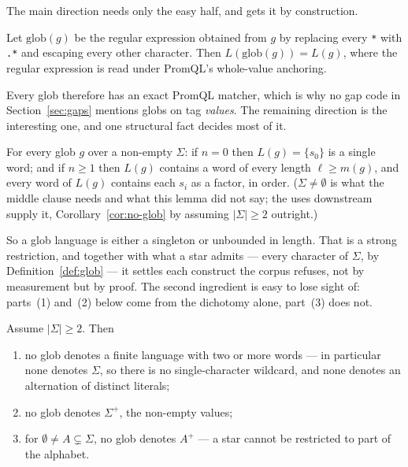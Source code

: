 The main direction needs only the easy half, and gets it by construction.

\begin{proposition}\label{prop:glob-regex}
Let $\mathrm{glob}(g)$ be the regular expression obtained from $g$ by replacing every
\texttt{*} with \texttt{.*} and escaping every other character. Then
$L(\mathrm{glob}(g))=L(g)$, where the regular expression is read under PromQL's whole-value
anchoring.
\end{proposition}

\iffull\fi

\noindent
Every glob therefore has an exact PromQL matcher, which is why no gap code in
Section~\ref{sec:gaps} mentions globs on tag \emph{values}. The remaining direction is
the interesting one, and one structural fact decides most of it.

\begin{lemma}[Dichotomy]\label{lem:dichotomy}
For every glob $g$ over a non-empty $\Sigma$: if $n=0$ then $L(g)=\{s_0\}$ is a single
word; and if $n\ge 1$ then $L(g)$ contains a word of every length $\ell\ge m(g)$, and
every word of $L(g)$ contains each $s_i$ as a factor, in order. ($\Sigma\neq\emptyset$ is
what the middle clause needs and what this lemma did not say; the uses downstream supply
it, Corollary~\ref{cor:no-glob} by assuming $|\Sigma|\ge2$ outright.)
\end{lemma}

\iffull\fi

\iffull\fi

\noindent
So a glob language is either a singleton or unbounded in length. That is a strong
restriction, and together with what a star admits --- every character of $\Sigma$,
by Definition~\ref{def:glob} --- it settles each construct the corpus refuses, not by
measurement but by proof. The second ingredient is easy to lose sight of: parts~(1)
and~(2) below come from the dichotomy alone, part~(3) does not.

\begin{corollary}\label{cor:no-glob}
Assume $|\Sigma|\ge 2$. Then
\begin{enumerate}
\item no glob denotes a finite language with two or more words --- in particular none
denotes $\Sigma$, so there is no single-character wildcard, and none denotes an
alternation of distinct literals;
\item no glob denotes $\Sigma^{+}$, the non-empty values;
\item for $\emptyset\neq A\subsetneq\Sigma$, no glob denotes $A^{+}$ --- a star cannot be
restricted to part of the alphabet.
\end{enumerate}
\end{corollary}

